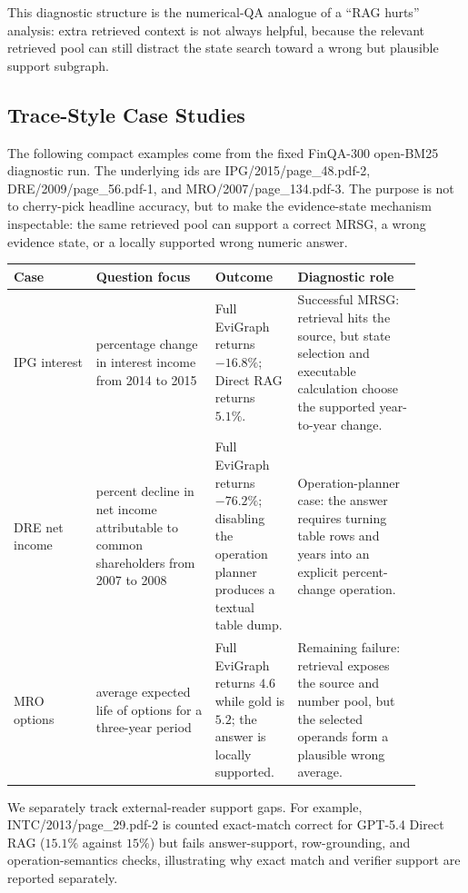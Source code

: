 This diagnostic structure is the numerical-QA analogue of a ``RAG hurts''
analysis: extra retrieved context is not always helpful, because the relevant
retrieved pool can still distract the state search toward a wrong but plausible
support subgraph.

\subsection{Trace-Style Case Studies}

The following compact examples come from the fixed FinQA-300 open-BM25
diagnostic run.  The underlying ids are IPG/2015/page\_48.pdf-2,
DRE/2009/page\_56.pdf-1, and MRO/2007/page\_134.pdf-3.  The purpose is not to
cherry-pick headline accuracy, but to make the evidence-state mechanism
inspectable: the same retrieved pool can support a correct MRSG, a wrong
evidence state, or a locally supported wrong numeric answer.

\begin{center}
\small
\begin{tabular}{p{0.18\linewidth}p{0.26\linewidth}p{0.18\linewidth}p{0.27\linewidth}}
\hline
Case & Question focus & Outcome & Diagnostic role \\
\hline
IPG interest & percentage change in interest income from 2014 to
2015 & Full EviGraph returns \(-16.8\%\); Direct RAG returns \(5.1\%\). &
Successful MRSG: retrieval hits the source, but state selection and executable
calculation choose the supported year-to-year change. \\
DRE net income & percent decline in net income attributable to common
shareholders from 2007 to 2008 & Full EviGraph returns \(-76.2\%\); disabling
the operation planner produces a textual table dump. & Operation-planner case:
the answer requires turning table rows and years into an explicit percent-change
operation. \\
MRO options & average expected life of options for a three-year
period & Full EviGraph returns \(4.6\) while gold is \(5.2\); the answer is
locally supported. & Remaining failure: retrieval exposes the source and number
pool, but the selected operands form a plausible wrong average. \\
\hline
\end{tabular}
\end{center}

We separately track external-reader support gaps.  For example,
INTC/2013/page\_29.pdf-2 is counted exact-match correct for GPT-5.4 Direct RAG
(\(15.1\%\) against \(15\%\)) but fails answer-support, row-grounding, and
operation-semantics checks, illustrating why exact match and verifier support are
reported separately.

